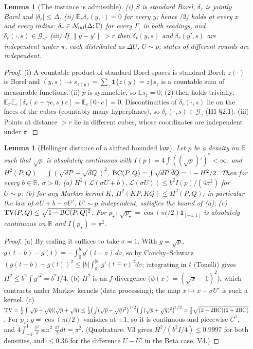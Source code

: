 \documentclass[11pt,a4paper]{article}
\numberwithin{equation}{section}
\newtheorem{lemma}[theorem]{Lemma}
\theoremstyle{definition}
\theoremstyle{remark}
\newcommand{\E}{\mathbb E}\newcommand{\R}{\mathbb R}\newcommand{\Z}{\mathbb Z}\newcommand{\Prob}{\mathbb P}
\newcommand{\norm}[1]{\lVert #1\rVert}\newcommand{\abs}[1]{\lvert #1\rvert}\newcommand{\ip}[2]{\langle #1,#2\rangle}
\newcommand{\cN}{\mathcal N}\newcommand{\cA}{\mathcal A}\newcommand{\cG}{\mathcal G}\newcommand{\cF}{\mathcal F}
\begin{document}
\begin{lemma}[The instance is admissible]\label{lem:inclass}
(i) $S$ is standard Borel, $\delta_r$ is jointly Borel and $\abs{\delta_r}\le\Delta$. (ii) $\E_\pi\delta_r(y,\cdot)=0$ for every $y$; hence (2) holds at every $x$ and every radius: $\delta_r\in\cN_\iid(\Delta;\Gamma)$ for every $\Gamma$, in both readings, and $\delta_r(\cdot,s)\in\cG_\gamma$. (iii) If $\norm{y-y'}>r$ then $\delta_r(y,s)$ and $\delta_r(y',s)$ are independent under $\pi$, each distributed as $\Delta U$, $U\sim p$; states of different rounds are independent.
\end{lemma}
\begin{proof}
(i) A countable product of standard Borel spaces is standard Borel; $z(\cdot)$ is Borel and $(y,s)\mapsto s_{z(y)}=\sum_z\mathbf 1\{z(y)=z\}s_z$ is a countable sum of measurable functions. (ii) $p$ is symmetric, so $\E s_z=0$; (2) then holds trivially: $\E_\pi\E_e[\delta_r(x+\gamma e,s)e]=\E_e[0\cdot e]=0$. Discontinuities of $\delta_r(\cdot,s)$ lie on the faces of the cubes (countably many hyperplanes), so $\delta_r(\cdot,s)\in\cG_\gamma$ (H1 \S2.1). (iii) Points at distance $>r$ lie in different cubes, whose coordinates are independent under $\pi$.
\end{proof}

\begin{lemma}[Hellinger distance of a shifted bounded law]\label{lem:hell}
Let $p$ be a density on $\R$ such that $\sqrt p$ is absolutely continuous with $I(p)=4\int((\sqrt p)')^2<\infty$, and $H^2(P,Q)=\int(\sqrt{dP}-\sqrt{dQ})^2$, $\mathrm{BC}(P,Q)=\int\sqrt{dP\,dQ}=1-H^2/2$. Then for every $b\in\R$, $\sigma>0$:
(a) $H^2(\mathcal L(\sigma U+b),\mathcal L(\sigma U))\le b^2I(p)/(4\sigma^2)$ for $U\sim p$;
(b) for any Markov kernel $K$, $H^2(KP,KQ)\le H^2(P,Q)$; in particular the law of $\sigma U+b-\sigma U'$, $U'\sim p$ independent, satisfies the bound of (a);
(c) $\mathrm{TV}(P,Q)\le\sqrt{1-\mathrm{BC}(P,Q)^2}$.
For $p_\star$: $\sqrt{p_\star}=\cos(\pi t/2)\mathbf 1_{[-1,1]}$ is absolutely continuous on $\R$ and $I(p_\star)=\pi^2$.
\end{lemma}
\begin{proof}
(a) By scaling it suffices to take $\sigma=1$. With $g=\sqrt p$, $g(t-b)-g(t)=-\int_0^bg'(t-v)\,dv$, so by Cauchy--Schwarz $(g(t-b)-g(t))^2\le\abs b\int_0^{\abs b}g'(t\mp v)^2dv$; integrating in $t$ (Tonelli) gives $H^2\le b^2\int g'^2=b^2I/4$. (b) $H^2$ is an $f$-divergence ($\phi(x)=(\sqrt x-1)^2$), which contracts under Markov kernels (data processing); the map $x\mapsto x-\sigma U'$ is such a kernel. (c) $\TV=\frac12\int\abs{\sqrt p-\sqrt q}(\sqrt p+\sqrt q)\le\frac12\big(\int(\sqrt p-\sqrt q)^2\big)^{1/2}\big(\int(\sqrt p+\sqrt q)^2\big)^{1/2}=\frac12\sqrt{(2-2\BC)(2+2\BC)}$. For $p_\star$: $g=\cos(\pi t/2)$ vanishes at $\pm1$, so it is continuous and piecewise $C^1$, and $4\int_{-1}^1\frac{\pi^2}4\sin^2\frac{\pi t}2dt=\pi^2$. (Quadrature: V3 gives $H^2/(b^2I/4)\le0.9997$ for both densities, and $\le0.36$ for the difference $U-U'$ in the Beta case, V4.)
\end{proof}
\end{document}
